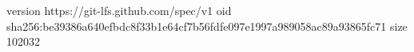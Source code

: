 version https://git-lfs.github.com/spec/v1
oid sha256:be39386a640efbdc8f33b1e64cf7b56fdfe097e1997a989058ac89a93865fc71
size 102032
